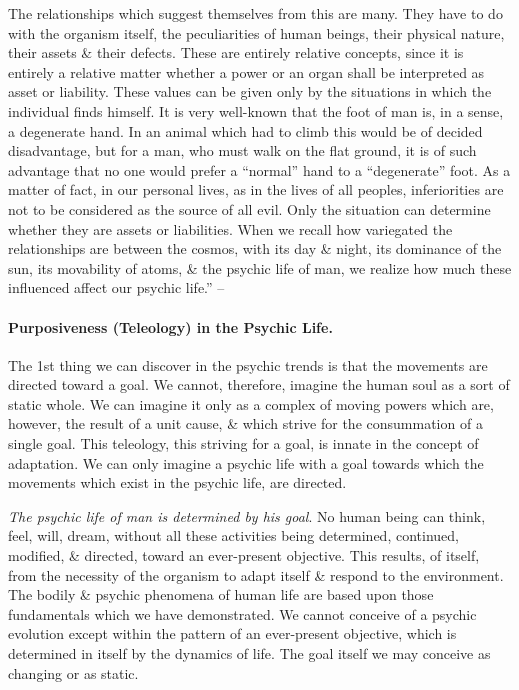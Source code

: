 \documentclass{article}
\begin{document}
The relationships which suggest themselves from this are many. They have to do with the organism itself, the peculiarities of human beings, their physical nature, their assets \& their defects. These are entirely relative concepts, since it is entirely a relative matter whether a power or an organ shall be interpreted as asset or liability. These values can be given only by the situations in which the individual finds himself. It is very well-known that the foot of man is, in a sense, a degenerate hand. In an animal which had to climb this would be of decided disadvantage, but for a man, who must walk on the flat ground, it is of such advantage that no one would prefer a ``normal'' hand to a ``degenerate'' foot. As a matter of fact, in our personal lives, as in the lives of all peoples, inferiorities are not to be considered as the source of all evil. Only the situation can determine whether they are assets or liabilities. When we recall how variegated the relationships are between the cosmos, with its day \& night, its dominance of the sun, its movability of atoms, \& the psychic life of man, we realize how much these influenced affect our psychic life.'' -- \cite[pp. 18--19]{Adler_human_nature}

\paragraph{Purposiveness (Teleology) in the Psychic Life.} The 1st thing we can discover in the psychic trends is that the movements are directed toward a goal. We cannot, therefore, imagine the human soul as a sort of static whole. We can imagine it only as a complex of moving powers which are, however, the result of a unit cause, \& which strive for the consummation of a single goal. This teleology, this striving for a goal, is innate in the concept of adaptation. We can only imagine a psychic life with a goal towards which the movements which exist in the psychic life, are directed.

{\it The psychic life of man is determined by his goal}. No human being can think, feel, will, dream, without all these activities being determined, continued, modified, \& directed, toward an ever-present objective. This results, of itself, from the necessity of the organism to adapt itself \& respond to the environment. The bodily \& psychic phenomena of human life are based upon those fundamentals which we have demonstrated. We cannot conceive of a psychic evolution except within the pattern of an ever-present objective, which is determined in itself by the dynamics of life. The goal itself we may conceive as changing or as static.
\end{document}
